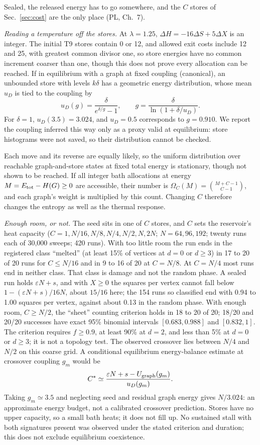 \documentclass[aps,pre,10pt,twocolumn,superscriptaddress,nofootinbib]{revtex4-2}
\begin{document}
Sealed, the released energy has to go somewhere, and the $C$ stores of Sec.~\ref{sec:cost} are the
only place (PL, Ch.~7).

\emph{Reading a temperature off the stores.} At $\lambda=1.25$, $\Delta H=-16\Delta S+5\Delta X$ is an integer.
The initial T9 stores contain 0 or 12, and allowed exit costs include 12 and 25, with greatest common
divisor one, so store energies have no common increment coarser than one, though this does not prove every
allocation can be reached. If in equilibrium with a graph at fixed coupling (canonical), an
unbounded store with levels $k\delta$ has a geometric energy distribution, whose mean $u_D$ is tied
to the coupling by
\[
u_D(g)=\frac{\delta}{e^{\delta/g}-1},\qquad
g=\frac{\delta}{\ln(1+\delta/u_D)}.
\]
For $\delta=1$, $u_D(3.5)=3.024$, and $u_D=0.5$ corresponds to $g=0.910$. We report the coupling inferred this way
only as a proxy valid at equilibrium: store histograms were not saved, so their distribution cannot be
checked.

Each move and its reverse are equally likely, so the uniform distribution over reachable graph-and-store
states at fixed total energy is stationary, though not shown to be reached. If all integer bath allocations at
energy $M=E_{\rm tot}-H(G)\ge0$ are accessible, their number is $\Omega_C(M)=\binom{M+C-1}{C-1}$, and
each graph's weight is multiplied by this count. Changing $C$ therefore changes the entropy
as well as the thermal response.

\emph{Enough room, or not.} The seed sits in one of $C$ stores, and $C$ sets the reservoir's heat
capacity ($C=1,N/16,N/8,N/4,N/2,N,2N$; $N=64,96,192$; twenty runs each of 30,000 sweeps; 420 runs).
With too little room the
run ends in the registered class ``melted'' (at least 15\% of vertices at $d=0$ or $d\ge3$) in 17 to
20 of 20 runs for $C\le N/16$ and in 9 to 16 of 20 at $C=N/8$. At $C=N/4$ most runs end in neither
class. That class is damage and not the random phase. A sealed run holds $\varepsilon N+s$, and with
$X\ge0$ the squares per vertex cannot fall below $1-(\varepsilon N+s)/16N$, about $15/16$ here; the
154 runs so classified end with 0.94 to 1.00 squares per vertex, against about 0.13 in the random
phase. With enough room,
$C\ge N/2$, the ``sheet'' counting criterion holds in 18 to 20 of 20; 18/20 and
20/20 successes have exact 95\% binomial intervals $[0.683,0.988]$ and $[0.832,1]$. The criterion
requires $f\ge0.9$, at least 90\% at $d=2$, and less than 5\% at $d=0$ or $d\ge3$; it is not a
topology test. The observed crossover lies between $N/4$ and $N/2$ on this coarse grid. A conditional
equilibrium energy-balance estimate at crossover coupling $g_m$ would be
\[
C^*\simeq\frac{\varepsilon N+s-U_{\rm graph}(g_m)}{u_D(g_m)}.
\]
Taking $g_m\simeq3.5$ and neglecting seed and residual graph energy gives $N/3.024$: an approximate
energy budget, not a calibrated crossover prediction. Stores have no upper capacity, so a small bath
heats; it does not fill up. No sustained stall with both signatures present was observed under the
stated criterion and duration; this does not exclude equilibrium coexistence.
\end{document}
